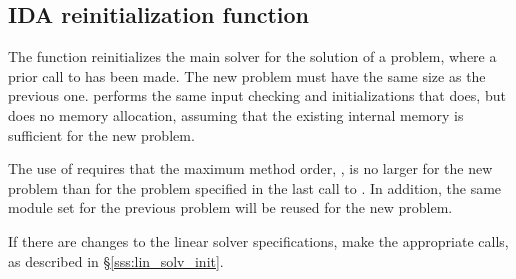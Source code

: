 \subsection{IDA reinitialization function}\label{sss:idareinit}

The function  reinitializes the main {\ida} solver for
the solution of a problem, where a prior call to  has
been made. The new problem must have the same size as the previous one.
 performs the same input checking and initializations 
that  does, but does no memory allocation, assuming that the 
existing internal memory is sufficient for the new problem.             
                                                                 
The use of  requires that the maximum method order,    
, is no larger for the new problem than for the problem  
specified in the last call to .  In addition, the same
{\nvector} module set for the previous problem
will be reused for the new problem.

If there are changes to the linear solver specifications, make the
appropriate  calls, as described in \S\ref{sss:lin_solv_init}.

